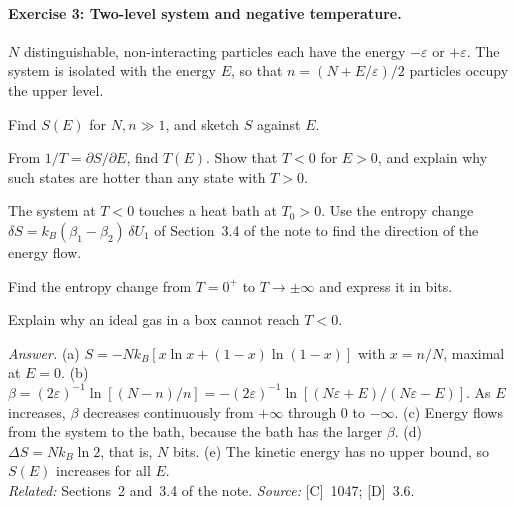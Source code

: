 \documentclass[11pt]{article}      %
\numberwithin{equation}{section}   %
\begin{document}
\paragraph{Exercise 3: Two-level system and negative temperature.}
$N$ distinguishable, non-interacting particles each have the energy $-\varepsilon$ or $+\varepsilon$. The system is isolated with the energy $E$, so that $n = (N + E/\varepsilon)/2$ particles occupy the upper level.
\begin{parts}
    \item Find $S(E)$ for $N, n \gg 1$, and sketch $S$ against $E$.
    \item From $1/T = \partial S/\partial E$, find $T(E)$. Show that $T < 0$ for $E > 0$, and explain why such states are hotter than any state with $T > 0$.
    \item The system at $T < 0$ touches a heat bath at $T_0 > 0$. Use the entropy change $\delta S = k_B(\beta_1 - \beta_2)\,\delta U_1$ of Section~3.4 of the note to find the direction of the energy flow.
    \item Find the entropy change from $T = 0^+$ to $T \to \pm\infty$ and express it in bits.
    \item Explain why an ideal gas in a box cannot reach $T < 0$.
\end{parts}
\textit{Answer.} (a) $S = -Nk_B[x\ln x + (1 - x)\ln(1 - x)]$ with $x = n/N$, maximal at $E = 0$. (b) $\beta = (2\varepsilon)^{-1}\ln[(N - n)/n] = -(2\varepsilon)^{-1}\ln[(N\varepsilon + E)/(N\varepsilon - E)]$. As $E$ increases, $\beta$ decreases continuously from $+\infty$ through $0$ to $-\infty$. (c) Energy flows from the system to the bath, because the bath has the larger $\beta$. (d) $\Delta S = Nk_B\ln 2$, that is, $N$ bits. (e) The kinetic energy has no upper bound, so $S(E)$ increases for all $E$.\\
\textit{Related:} Sections~2 and~3.4 of the note. \textit{Source:} [C]~1047; [D]~3.6.
\end{document}
